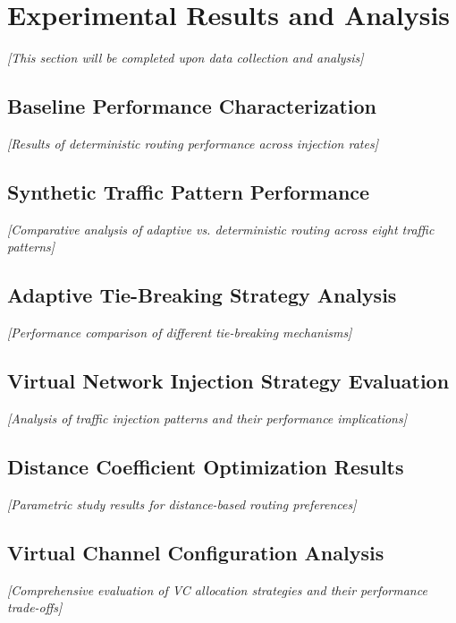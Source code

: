\documentclass[a4paper,12pt]{article}
\begin{document}
\section{Experimental Results and Analysis}

\textit{[This section will be completed upon data collection and analysis]}

\subsection{Baseline Performance Characterization}

\textit{[Results of deterministic routing performance across injection rates]}

\subsection{Synthetic Traffic Pattern Performance}

\textit{[Comparative analysis of adaptive vs. deterministic routing across eight traffic patterns]}

\subsection{Adaptive Tie-Breaking Strategy Analysis}

\textit{[Performance comparison of different tie-breaking mechanisms]}

\subsection{Virtual Network Injection Strategy Evaluation}

\textit{[Analysis of traffic injection patterns and their performance implications]}

\subsection{Distance Coefficient Optimization Results}

\textit{[Parametric study results for distance-based routing preferences]}

\subsection{Virtual Channel Configuration Analysis}

\textit{[Comprehensive evaluation of VC allocation strategies and their performance trade-offs]}
\end{document}
